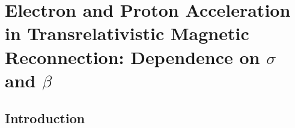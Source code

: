 \chapter[Electron and Proton Acceleration in Transrelativistic Magnetic Reconnection: Dependence on $\sigma$ and $\beta$]
{Electron and Proton Acceleration in Transrelativistic Magnetic Reconnection: Dependence on $\sigma$ and $\beta$}
\section{Introduction}




